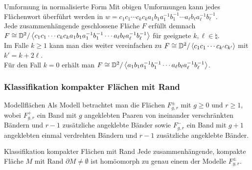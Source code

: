 \begin{Satz}{Umformung in normalisierte Form}
    Mit obigen Umformungen kann jedes Flächenwort überführt werden in
    $w = c_1 c_1 \dotsb c_k c_k a_1 b_1 a_1^{-1} b_1^{-1} \dotsb
    a_\ell b_\ell a_\ell^{-1} b_\ell^{-1}$. \\
    Jede zusammenhängende geschlossene Fläche $F$ erfüllt demnach \\
    $F \cong \mathbb{D}^2 /
    \left\langle{c_1 c_1 \dotsb c_k c_k a_1 b_1 a_1^{-1} b_1^{-1} \dotsb
    a_\ell b_\ell a_\ell^{-1} b_\ell^{-1}}\right\rangle$ für geeignete
    $k, \ell \in \natural$. \\
    Im Falle $k \ge 1$ kann man dies weiter vereinfachen zu
    $F \cong \mathbb{D}^2 / \left\langle{c_1 c_1 \dotsb c_{k'} c_{k'}}\right\rangle$
    mit $k' = k + 2\ell$. \\
    Für den Fall $k = 0$ erhält man
    $F \cong \mathbb{D}^2 / \left\langle{a_1 b_1 a_1^{-1} b_1^{-1} \dotsb
    a_\ell b_\ell a_\ell^{-1} b_\ell^{-1}}\right\rangle$.
\end{Satz}

\subsubsection{%
    Klassifikation kompakter Flächen mit Rand%
}

\begin{Def}{Modellflächen}
    Als Modell betrachtet man die Flächen $F_{g,r}^\pm$ mit $g \ge 0$ und
    $r \ge 1$, wobei
    $F_{g,r}^+$ ein Band mit $g$ angeklebten Paaren von ineinander
    verschränkten Bändern und $r - 1$ zusätzliche angeklebte Bänder sowie
    $F_{g,r}^-$ ein Band mit $g + 1$ angeklebten einmal verdrehten Bändern
    und $r - 1$ zusätzliche angeklebte Bänder.
\end{Def}

\begin{Satz}{Klassifikation kompakter Flächen mit Rand}
    Jede zusammenhängende, kompakte Fläche $M$ mit Rand
    $\partial M \not= \emptyset$ ist homöomorph zu genau einem der Modelle
    $F_{g,r}^\pm$.
\end{Satz}

\pagebreak
